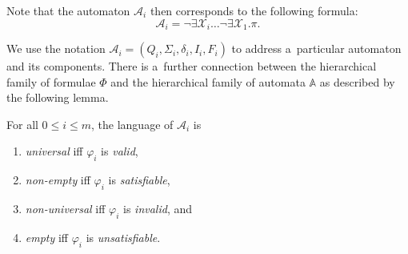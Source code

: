  Note that the automaton $\mathcal{A}_i$ then corresponds to the following
formula:
 \begin{equation} \mathcal{A}_i =
 \neg\exists\mathcal{X}_i\ldots\neg\exists\mathcal{X}_1.
 \pi.
 \end{equation}
 
 We use the notation $\mathcal{A}_i = (Q_i, \Sigma_i, \delta_i, I_i, F_i)$ to
 address a~particular automaton and its components.
There is a~further connection between the hierarchical family of formulae $\Phi$
and the hierarchical family of automata $\mathbb{A}$ as described by the
following lemma.
 \begin{lemma}\label{uni-valid} For all $0 \leq i \leq m$, the language of
$\mathcal{A}_i$ is
\begin{enumerate}
  \item \emph{universal} iff $\varphi_i$ is \emph{valid},
  \item \emph{non-empty} iff $\varphi_i$ is \emph{satisfiable},
  \item \emph{non-universal} iff $\varphi_i$ is \emph{invalid}, and
  \item \emph{empty} iff $\varphi_i$ is \emph{unsatisfiable}.
\end{enumerate}
\end{lemma}

